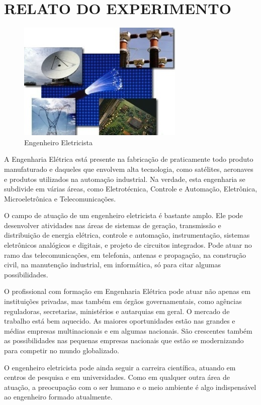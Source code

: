 \chapter{RELATO DO EXPERIMENTO}

\begin{figure}[H]
	\centering
	\caption{Engenheiro Eletricista}
	\label{fig:engenheiroeletricista}
	\includegraphics[width=0.7\linewidth]{data/figures/EngenheiroEletricista}
\end{figure}

A Engenharia Elétrica está presente na fabricação de praticamente todo produto manufaturado e daqueles que envolvem alta tecnologia, como satélites, aeronaves e produtos utilizados na automação industrial. Na verdade, esta engenharia se subdivide em várias áreas, como Eletrotécnica, Controle e Automação, Eletrônica, Microeletrônica e Telecomunicações.

O campo de atuação de um engenheiro eletricista é bastante amplo. Ele pode desenvolver atividades nas áreas de sistemas de geração, transmissão e distribuição de energia elétrica, controle e automação, instrumentação, sistemas eletrônicos analógicos e digitais, e projeto de circuitos integrados. Pode atuar no ramo das telecomunicações, em telefonia, antenas e propagação, na construção civil, na manutenção industrial, em informática, só para citar algumas possibilidades.

O profissional com formação em Engenharia Elétrica pode atuar não apenas em instituições privadas, mas também em órgãos governamentais, como agências reguladoras, secretarias, ministérios e autarquias em geral.
O mercado de trabalho está bem aquecido. As maiores oportunidades estão nas grandes e médias empresas multinacionais e em algumas nacionais. São crescentes também as possibilidades nas pequenas empresas nacionais que estão se modernizando para competir no mundo globalizado.

O engenheiro eletricista pode ainda seguir a carreira científica, atuando em centros de pesquisa e em universidades. Como em qualquer outra área de atuação, a preocupação com o ser humano e o meio ambiente é algo indispensável ao engenheiro formado atualmente.